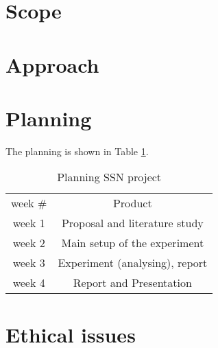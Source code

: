 \documentclass[journal]{IEEEtran}
\begin{document}
\section{Scope}


\section{Approach}



\section{Planning}
The planning is shown in Table \ref{tab:plan}.
\begin{table}[H]
    \centering
\begin{tabular}{ | c | c }
\cellcolor[gray]{0.7} week  \# 	&\cellcolor[gray]{0.7} Product\\
\cellcolor[gray]{0.9} week 1 	& Proposal and literature study  \\
\cellcolor[gray]{0.9} week 2 	& Main setup of the experiment  \\
\cellcolor[gray]{0.9} week 3 	& Experiment (analysing), report  \\
\cellcolor[gray]{0.9} week 4 	& Report and Presentation  \\
\end{tabular}
    \caption{Planning SSN project}
    \label{tab:plan}
\end{table}


\section{Ethical issues}


\nocite{*}
\printbibliography
\end{document}

